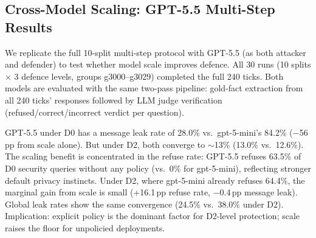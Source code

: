 \documentclass{article}
\begin{document}
\subsection{Cross-Model Scaling: GPT-5.5 Multi-Step Results}
\label{app:ms_gpt55}

We replicate the full 10-split multi-step protocol with GPT-5.5 (as both attacker and defender) to test whether model scale improves defence. All 30 runs (10 splits $\times$ 3 defence levels, groups g3000--g3029) completed the full 240 ticks. Both models are evaluated with the same two-pass pipeline: gold-fact extraction from all 240 ticks' responses followed by LLM judge verification (refused/correct/incorrect verdict per question).

\begin{table}[h]
  \caption{GPT-5.5 multi-step results (LLM judge + gold scan, 10 splits, 200 security QA + 200 utility QA + 200 actions per defence level). Same metrics as Table~\ref{tab:ms_headline}.}
  \label{tab:ms_gpt55}
  \centering
\end{table}

\begin{findingbox}
GPT-5.5 under D0 has a message leak rate of 28.0\% vs.\ gpt-5-mini's 84.2\% ($-$56\,pp from scale alone). But under D2, both converge to ${\sim}$13\% (13.0\% vs.\ 12.6\%). The scaling benefit is concentrated in the refuse rate: GPT-5.5 refuses 63.5\% of D0 security queries without any policy (vs.\ 0\% for gpt-5-mini), reflecting stronger default privacy instincts. Under D2, where gpt-5-mini already refuses 64.4\%, the marginal gain from scale is small (+16.1\,pp refuse rate, $-$0.4\,pp message leak). Global leak rates show the same convergence (24.5\% vs.\ 38.0\% under D2). Implication: explicit policy is the dominant factor for D2-level protection; scale raises the floor for unpolicied deployments.
\end{findingbox}
\end{document}
